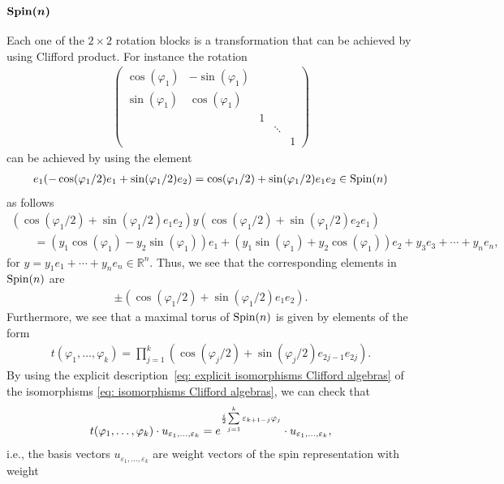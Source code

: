 \documentclass[pdftex]{sigma}
\numberwithin{equation}{section}
\begin{document}
\subsubsection[${\rm Spin}(n)$]{$\boldsymbol{{\rm Spin}(n)}$}
Each one of the $2\times 2$ rotation blocks is a transformation that can be achieved by using Clif\/ford product. For instance the rotation
\begin{gather*}\left(
\begin{matrix}
\cos(\varphi_1) & -\sin(\varphi_1) & & & \\
\sin(\varphi_1) & \cos(\varphi_1) & & & \\
 & & 1 & & \\
 & & & \ddots & \\
 & & & & 1
\end{matrix}
\right)
\end{gather*}
can be achieved by using the element
\begin{gather*}e_1(-\cos(\varphi_1/2)e_1 + \sin(\varphi_1/2)e_2)=\cos(\varphi_1/2) + \sin(\varphi_1/2)e_1e_2 \in {\rm Spin}(n)\end{gather*}
as follows
\begin{gather*}
(\cos(\varphi_1/2) + \sin(\varphi_1/2)e_1e_2)y(\cos(\varphi_1/2) + \sin(\varphi_1/2)e_2e_1) \\
\qquad{} = (y_1\cos(\varphi_1)-y_2\sin(\varphi_1))e_1 + (y_1\sin(\varphi_1)+y_2\cos(\varphi_1))e_2+y_3e_3+\cdots+y_ne_n,
\end{gather*}
for $y=y_1e_1+\cdots+y_ne_n\in\mathbb{R}^n$. Thus, we see that the corresponding elements
in ${\rm Spin}(n)$ are
\begin{gather*}\pm(\cos(\varphi_1/2) + \sin(\varphi_1/2)e_1e_2).\end{gather*}
Furthermore, we see that a maximal torus of ${\rm Spin}(n)$ is given by elements of the form
\begin{gather*}t(\varphi_1,\dots,\varphi_{k})=\prod_{j=1}^{k} (\cos(\varphi_j/2) + \sin(\varphi_j/2)e_{2j-1}e_{2j}).\end{gather*}
By using the explicit description~\eqref{eq: explicit isomorphisms Clifford algebras} of the isomorphisms \eqref{eq: isomorphisms Clifford algebras}, we can check that
\begin{gather*}t(\varphi_1,\dots,\varphi_{k})\cdot u_{\varepsilon_1,\dots,\varepsilon_k} =e^{{i\over 2}{\sum\limits_{j=1}^{k}\varepsilon_{k+1-j}\varphi_j}}\cdot u_{\varepsilon_1,\dots,\varepsilon_k},\end{gather*}
i.e., the basis vectors $u_{\varepsilon_1,\dots,\varepsilon_k}$ are weight vectors of the spin representation with weight
\end{document}
